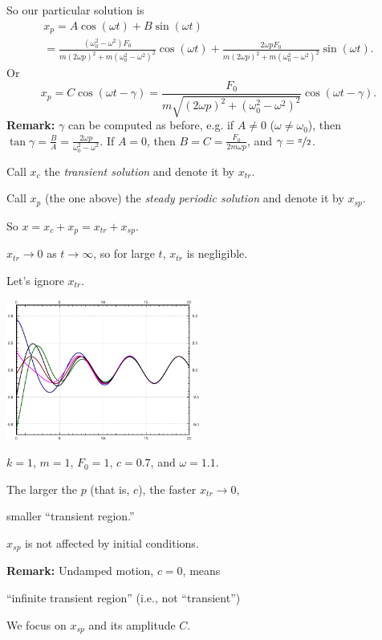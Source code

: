 \documentclass[10pt,aspectratio=169]{beamer}
\begin{document}
\begin{frame}
So our particular solution is
\begin{multline*}
x_p = 
A \cos (\omega t) + B \sin (\omega t)
\\
=
\frac{(\omega_0^2-\omega^2) F_0}
{m{(2\omega p)}^2+m{(\omega_0^2-\omega^2)}^2} \cos (\omega t) +
\frac{2 \omega p F_0}
{m{(2\omega p)}^2+m{(\omega_0^2-\omega^2)}^2} \sin (\omega t) .
\end{multline*}
\pause
Or
\[
x_p = 
C \cos(\omega t - \gamma)
=
\frac{F_0}{m \sqrt{{(2\omega p)}^2+{(\omega_0^2-\omega^2)}^2}} 
\cos ( \omega t - \gamma ) .
\]
\pause
\textbf{Remark:}
$\gamma$ can be computed as before, e.g. if 
$A \not=0$ ($\omega \not= \omega_0$), then
$\tan \gamma = \frac{B}{A} = \frac{2\omega p}{\omega_0^2-\omega^2}$.
If $A=0$, then $B = C = \frac{F_0}{2m\omega p}$,
and $\gamma = \nicefrac{\pi}{2}$.
\end{frame}

\begin{frame}
Call $x_c$ the
\emph{transient solution}
and denote it by $x_{tr}$.

\medskip
\pause

Call $x_p$ (the one above) the
\emph{steady periodic solution}
and denote it by $x_{sp}$.

\pause
\medskip

So
\quad
$x = x_c + x_p = x_{tr} + x_{sp}$.

\medskip
\pause

$x_{tr} \to 0$ as $t \to \infty$, so for large $t$, $x_{tr}$
is negligible.

Let's ignore $x_{tr}$.

\vspace*{-0.55in}

\hfill\includegraphics[width=2.5in]{../figures/3-6-transbeh}

\hfill $k=1$, $m=1$, $F_0 = 1$, $c=0.7$, and $\omega=1.1$.

\pause
\vspace*{-1.40in}

The larger the $p$ (that is, $c$), the
faster $x_{tr} \to 0$,

\thus
\quad 
smaller ``transient region.''

\medskip
\pause

$x_{sp}$ is not affected by initial conditions.

\medskip
\pause

\textbf{Remark:}
Undamped motion, $c=0$, means


``infinite transient region''
(i.e., not ``transient'')

\medskip
\pause

We focus on $x_{sp}$ and its amplitude $C$.

\end{frame}
\end{document}

